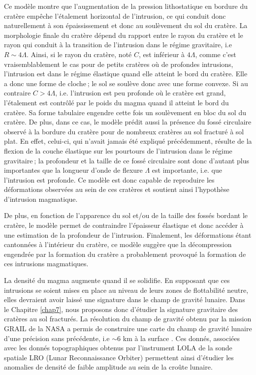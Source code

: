 Ce modèle montre que l’augmentation de la pression lithostatique en
bordure du cratère empêche l’étalement horizontal de l’intrusion, ce
qui conduit donc naturellement à son épaississement et donc au
soulèvement du sol du cratère. La morphologie finale du cratère dépend
du rapport entre le rayon du cratère et le rayon qui conduit à la
transition de l’intrusion dans le régime gravitaire, i.e
$R\sim 4\Lambda$. Ainsi, si le rayon du cratère, noté $C$, est
inférieur à $4\Lambda$, comme c’est vraisemblablement le cas pour de
petits cratères où de profondes intrusions, l’intrusion est dans le
régime élastique quand elle atteint le bord du cratère. Elle a donc
une forme de cloche ; le sol se soulève donc avec une forme convexe.
Si au contraire $C>4\Lambda$, i.e. l’intrusion est peu profonde où le
cratère est grand, l’étalement est contrôlé par le poids du magma
quand il atteint le bord du cratère. Sa forme tabulaire engendre cette
fois un soulèvement en bloc du sol du cratère. De plus, dans ce cas,
le modèle prédit aussi la présence du fossé circulaire observé à la
bordure du cratère pour de nombreux cratères au sol fracturé à sol
plat. En effet, celui-ci, qui n’avait jamais été expliqué
précédemment, résulte de la flexion de la couche élastique sur les
pourtours de l’intrusion dans le régime gravitaire ; la profondeur et
la taille de ce fossé circulaire sont donc d’autant plus importantes
que la longueur d’onde de flexure $\Lambda$ est importante, i.e. que
l’intrusion est profonde. Ce modèle est donc capable de reproduire les
déformations observées au sein de ces cratères et soutient ainsi
l’hypothèse d’intrusion magmatique.

De plus, en fonction de l’apparence du sol et/ou de la taille des
fossés bordant le cratère, le modèle permet de contraindre l’épaisseur
élastique et donc accéder à une estimation de la profondeur de
l’intrusion. Finalement, les déformations étant cantonnées à
l’intérieur du cratère, ce modèle suggère que la décompression
engendrée par la formation du cratère a probablement provoqué la
formation de ces intrusions magmatiques.

La densité du magma augmente quand il se solidifie. En supposant que
ces intrusions se soient mises en place au niveau de leurs zones de
flottabilité neutre, elles devraient avoir laissé une signature dans
le champ de gravité lunaire. Dans le Chapitre \ref{chap7}, nous
proposons donc d’étudier la signature gravitaire des cratères au sol
fracturés. La résolution du champ de gravité obtenu par la mission
GRAIL de la NASA a permis de construire une carte du champ de gravité
lunaire d’une précision sans précédente, i.e $\sim 6$ km à la
surface \citep{Zuber:2013cp}. Ces donnés, associées avec les donnés
topographiques obtenus par l’instrument LOLA de la sonde spatiale LRO
(Lunar Reconnaissance Orbiter) permettent ainsi d’étudier les
anomalies de densité de faible amplitude au sein de la croûte lunaire.

